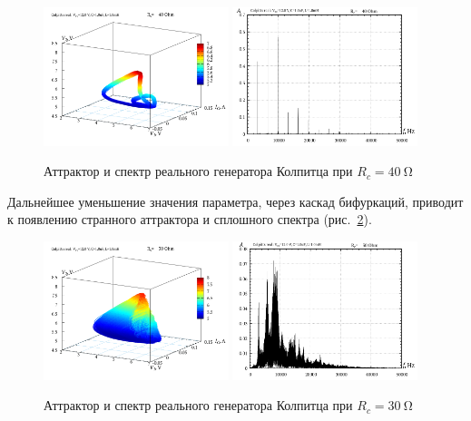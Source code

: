 \begin{figure}[htb!]
  \centerline{
    \includegraphics[width=0.48\textwidth]{p/r/v1iv2_040000.png}
    \hfill
    \includegraphics[width=0.48\textwidth]{p/r/f_040000.png}
  }
  \caption{Аттрактор и спектр реального генератора Колпитца при $R_c = \SI{40}{\ohm} $}
  \label{atu:f:colp_r_attr_f_40}
\end{figure}

Дальнейшее уменьшение значения параметра,
через каскад бифуркаций, приводит
к появлению странного аттрактора и сплошного спектра
(рис.~\ref{atu:f:colp_r_attr_f_30}).

\begin{figure}[htb!]
  \centerline{
    \includegraphics[width=0.48\textwidth]{p/r/v1iv2_030000.png}
    \hfill
    \includegraphics[width=0.48\textwidth]{p/r/f_030000.png}
  }
  \caption{Аттрактор и спектр реального генератора Колпитца при $R_c = \SI{30}{\ohm} $}
  \label{atu:f:colp_r_attr_f_30}
\end{figure}

